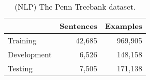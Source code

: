 \begin{table}[t]
\centering
{\small
\begin{tabular}{|l|r|r|}
        \hline & \textbf{Sentences} & \textbf{Examples} \\
        \hline
        Training & 42,685 & 969,905 \\
        Development & 6,526 & 148,158 \\
        Testing & 7,505 & 171,138 \\
        \hline
\end{tabular}
}
\caption{(NLP) The Penn Treebank dataset.}
\label{table:nlp-datasets}
\end{table}
